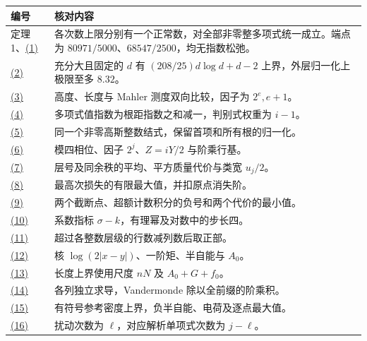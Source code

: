 \documentclass[11pt,a4paper]{article}
\newcounter{none}
\providecommand{\real}[1]{#1}
\begin{document}
{\def\LTcaptype{none} %
{\small
\begin{longtable}[]{@{}
  >{\raggedright\arraybackslash}p{(\linewidth - 2\tabcolsep) * \real{0.22}}
  >{\raggedright\arraybackslash}p{(\linewidth - 2\tabcolsep) * \real{0.78}}@{}}
\toprule\noalign{}
\begin{minipage}[b]{\linewidth}\raggedright
编号
\end{minipage} & \begin{minipage}[b]{\linewidth}\raggedright
核对内容
\end{minipage} \\
\midrule\noalign{}
\endhead
\bottomrule\noalign{}
\endlastfoot
定理 1、\hyperref[eq:1]{(1)} & 各次数上限分别有一个正常数，对全部非零整多项式统一成立。端点为 \(80971/5000\)、\(68547/2500\)，均无指数松弛。 \\
\hyperref[eq:2]{(2)} & 充分大且固定的 \(d\) 有 \((208/25)d\log d+d-2\) 上界，外层归一化上极限至多 \(8.32\)。 \\
\hyperref[eq:3]{(3)} & 高度、长度与 Mahler 测度双向比较，因子为 \(2^e,e+1\)。 \\
\hyperref[eq:4]{(4)} & 多项式值指数为根距指数之和减一，判别式权重为 \(i-1\)。 \\
\hyperref[eq:5]{(5)} & 同一个非零高斯整数结式，保留首项和所有根的归一化。 \\
\hyperref[eq:6]{(6)} & 模四相位、因子 \(2^j\)、\(Z=iY/2\) 与阶乘行基。 \\
\hyperref[eq:7]{(7)} & 层号及同余秩的平均、平方质量代价与类宽 \(u_j/2\)。 \\
\hyperref[eq:8]{(8)} & 最高次损失的有限最大值，并扣原点消失阶。 \\
\hyperref[eq:9]{(9)} & 两个截断点、超额计数积分的负号和两个代价的最小值。 \\
\hyperref[eq:10]{(10)} & 系数指标 \(\sigma-k\)，有理幂及对数中的步长四。 \\
\hyperref[eq:11]{(11)} & 超过各整数层级的行数减列数后取正部。 \\
\hyperref[eq:12]{(12)} & 核 \(\log(2\lvert x-y\rvert)\)、一阶矩、半自能与 \(A_0\)。 \\
\hyperref[eq:13]{(13)} & 长度上界使用尺度 \(nN\) 及 \(A_0+G+f_0\)。 \\
\hyperref[eq:14]{(14)} & 各列独立求导，Vandermonde 除以全前缀的阶乘积。 \\
\hyperref[eq:15]{(15)} & 有符号参考密度上界，负半自能、电荷及逐点最大值。 \\
\hyperref[eq:16]{(16)} & 扰动次数为 \(\ell\)，对应解析单项式次数为 \(j-\ell\)。 \\

\end{longtable}}}
\end{document}
